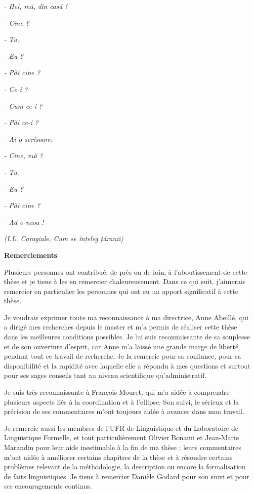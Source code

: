 {\itshape
- Hei, mă, din casă !}

{\itshape
- Cine ?}

{\itshape
- Tu.}

{\itshape
- Eu ?}

{\itshape
- Păi cine ?}

{\itshape
- Ce-i ?}

{\itshape
- Cum ce-i ?}

{\itshape
- Păi ce-i ?}

{\itshape
- Ai o scrisoare.}

{\itshape
- Cine, mă ?}

{\itshape
- Tu.}

{\itshape
- Eu ?}

{\itshape
- Păi cine ?}

{\itshape
- Ad-o-ncoa !~{\guillemotright}}

{\itshape
(I.L. Caragiale, \textup{Cum se înțeleg țăranii})}



{\bfseries
Remerciements}

Plusieurs personnes ont contribué, de près ou de loin, à l'aboutissement de cette thèse et je tiens à les en remercier chaleureusement. Dans ce qui suit, j'aimerais remercier en particulier les personnes qui ont eu un apport significatif à cette thèse.

Je voudrais exprimer toute ma reconnaissance à ma directrice, Anne Abeillé, qui a dirigé mes recherches depuis le master et m'a permis de réaliser cette thèse dans les meilleures conditions possibles. Je lui suis reconnaissante de sa souplesse et de son ouverture d'esprit, car Anne m'a laissé une grande marge de liberté pendant tout ce travail de recherche. Je la remercie pour sa confiance, pour sa disponibilité et la rapidité avec laquelle elle a répondu à mes questions et surtout pour ses sages conseils tant au niveau scientifique qu'administratif. 

Je suis très reconnaissante à François Mouret, qui m'a aidée à comprendre plusieurs aspects liés à la coordination et à l'ellipse. Son suivi, le sérieux et la précision de ses commentaires m'ont toujours aidée à avancer dans mon travail. 

Je remercie aussi les membres de l'UFR de Linguistique et du Laboratoire de Linguistique Formelle, et tout particulièrement Olivier Bonami et Jean-Marie Marandin pour leur aide inestimable à la fin de ma thèse ; leurs commentaires m'ont aidée à améliorer certains chapitres de la thèse et à résoudre certains problèmes relevant de la méthodologie, la description ou encore la formalisation de faits linguistiques. Je tiens à remercier Danièle Godard pour son suivi et pour ses encouragements continus. 


